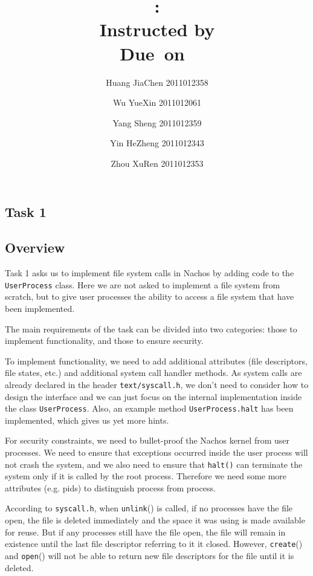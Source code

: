 \documentclass{article}
\title{\textmd{\bf \Class: \Title}\\{\large Instructed by \textit{\ClassInstructor}}\\\normalsize\vspace{0.1in}\small{Due\ on\ \DueDate}}
\date{}
\author{%
  Huang JiaChen 2011012358 \and
  Wu YueXin 2011012061 \and
  Yang Sheng 2011012359 \and
  Yin HeZheng 2011012343 \and
  Zhou XuRen 2011012353}
\begin{document}
  \begin{spacing}{1.1}
    \maketitle \thispagestyle{empty}



\section{Task 1}
\subsection{Overview}
Task 1 asks us to implement file system calls  in Nachos by adding code to the \texttt{UserProcess} class. Here we are not asked to implement a file system from scratch, but to give user processes the ability to access a file system that have been implemented.

The main requirements of the task can be divided into two categories: those to implement functionality, and those to ensure security.

To implement functionality, we need to add additional attributes (file descriptors, file states, etc.) and additional system call handler methods. As system calls are already declared in the header \texttt{text/syscall.h}, we don't need to consider how to design the interface and we can just focus on the internal implementation inside the class \texttt{UserProcess}. Also, an example method \texttt{UserProcess.halt} has been implemented, which gives us yet more hints.

For security constraints, we need to bullet-proof the Nachos kernel from user processes. We need to ensure that exceptions occurred inside the user process will not crash the system, and we also need to ensure that \texttt{halt()} can terminate the system only if it is called by the root process. Therefore we need some more attributes (e.g. pids) to distinguish process from process.

According to \texttt{syscall.h}, when \texttt{unlink}() is called,  if no processes have the file open, the file is deleted immediately and the space it was using is made available for reuse. But if any processes still have the file open, the file will remain in existence until the last file descriptor referring to it it closed. However, \texttt{create}() and \texttt{open}() will not be able to return new file descriptors for the file until it is deleted.


\end{spacing}
\end{document}
